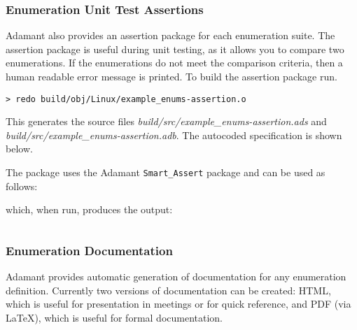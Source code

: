 \vspace{5mm} %
\inputminted{text}{../example_architecture/enum_representation/output.txt}
\vspace{5mm} %

\subsubsection{Enumeration Unit Test Assertions}

Adamant also provides an assertion package for each enumeration suite. The assertion package is useful during unit testing, as it allows you to compare two enumerations. If the enumerations do not meet the comparison criteria, then a human readable error message is printed. To build the assertion package run.

\vspace{5mm} %
\begin{verbatim}
> redo build/obj/Linux/example_enums-assertion.o
\end{verbatim}
\vspace{5mm} %

This generates the source files \textit{build/src/example\_enums-assertion.ads} and \textit{build/src/example\_enums-assertion.adb}. The autocoded specification is shown below.


The package uses the Adamant \texttt{Smart\_Assert} package and can be used as follows:


which, when run, produces the output:

\vspace{5mm} %
\inputminted{text}{../example_architecture/enum_assertion/output.txt}
\vspace{5mm} %

\subsubsection{Enumeration Documentation}

Adamant provides automatic generation of documentation for any enumeration definition. Currently two versions of documentation can be created: HTML, which is useful for presentation in meetings or for quick reference, and PDF (via \LaTeX), which is useful for formal documentation.\\

